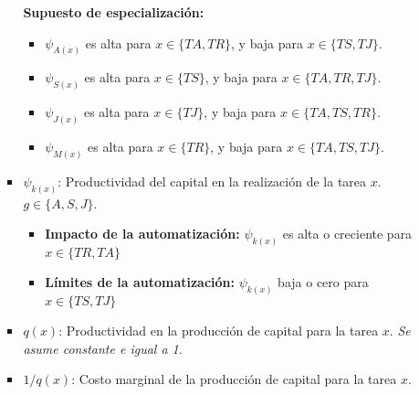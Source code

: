 \documentclass{article}
\theoremstyle{remark}
\theoremstyle{definition}
\begin{document}
\begin{enumerate}
\begin{tcolorbox}[title= Soluci\'on 3]
\begin{itemize}
\begin{itemize}
                        \textbf{Supuesto de especializaci\'on:}

                            \begin{itemize}
                                \item $\psi_{A(x)}$ es alta para $x \in \{TA,TR\}$, y baja para $x \in \{TS,TJ\}$.
                                \item $\psi_{S(x)}$ es alta para $x \in \{TS\}$, y baja para $x \in \{TA,TR,TJ\}$.
                                \item $\psi_{J(x)}$ es alta para $x \in \{TJ\}$, y baja para $x \in \{TA,TS,TR\}$.
                                \item $\psi_{M(x)}$ es alta para $x \in \{TR\}$, y baja para $x \in \{TA,TS,TJ\}$.
                            \end{itemize}
                            
                        \item $\psi_{k(x)}$: Productividad del capital en la realizaci\'on de la tarea $x$. $g \in \{A,S,J\}$.
                            \begin{itemize}
                                \item \textbf{Impacto de la automatizaci\'on:} $\psi_{k(x)}$ es alta o creciente para $x \in \{TR,TA\}$
                                \item \textbf{L\'imites de la automatizaci\'on:} $\psi_{k(x)}$ baja o cero para $x \in \{TS,TJ\}$
                            \end{itemize}
                        \item $q(x)$: Productividad en la producci\'on de capital para la tarea $x$. \emph{Se asume constante e igual a 1}.
                        \item $1/q(x)$: Costo marginal de la producci\'on de capital para la tarea $x$.
                    \end{itemize}
                

\end{itemize}
\end{tcolorbox}
\end{enumerate}
\end{document}
